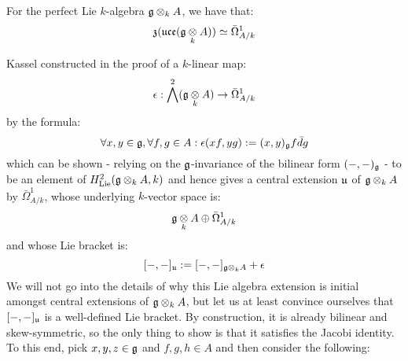         \begin{theorem} \label{theorem: kassel_realisation}
            \cite[Corollary 3.5]{kassel_universal_central_extensions_of_lie_algebras} For the perfect Lie $k$-algebra $\g \tensor_k A$, we have that:
                $$\z(\uce(\g \tensor_k A)) \cong \bar{\Omega}^1_{A/k}$$
        \end{theorem}
        Kassel constructed in the proof of \cite[Theorem 3.3]{kassel_universal_central_extensions_of_lie_algebras} a $k$-linear map:
            $$\e: \bigwedge^2 (\g \tensor_k A) \to \bar{\Omega}^1_{A/k}$$
        by the formula:
            $$\forall x, y \in \mathfrak{g}, \forall f, g \in A: \epsilon(x f, y g) := (x, y)_{\mathfrak{g}} f \bar{d}g$$
        which can be shown - relying on the $\mathfrak{g}$-invariance of the bilinear form $(-, -)_{\mathfrak{g}}$ - to be an element of $H^2_{\Lie}(\g \tensor_k A, k)$ and hence gives a central extension $\mathfrak{u}$ of $\g \tensor_k A$ by $\bar{\Omega}_{A/k}^1$, whose underlying $k$-vector space is:
            $$\g \tensor_k A \oplus \bar{\Omega}_{A/k}^1$$
        and whose Lie bracket is:
            $$[-, -]_{\fraku} := [-, -]_{\g \tensor_k A} + \e$$
        We will not go into the details of why this Lie algebra extension is initial amongst central extensions of $\g \tensor_k A$, but let us at least convince ourselves that $[-, -]_{\mathfrak{u}}$ is a well-defined Lie bracket. By construction, it is already bilinear and skew-symmetric, so the only thing to show is that it satisfies the Jacobi identity. To this end, pick $x, y, z \in \mathfrak{g}$ and $f, g, h \in A$ and then consider the following:
